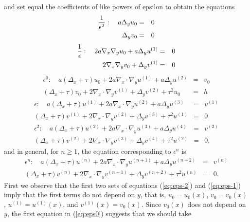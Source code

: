 \documentclass[12pt]{article}
\begin{document}
and set equal the coefficients of like powers of epsilon to obtain the equations
\begin{eqnarray}\label{eq:eps-2} {1\over{\epsilon^2}}: \quad  a\Delta_y u_0 &=& 0 \\ \Delta_y v_0 &=& 0 \nonumber\end{eqnarray}
\begin{eqnarray}\label{eq:eps-1} {1\over{\epsilon}}: \quad  2a \nabla_x \nabla_y u_0 +  a \Delta_y u^{(1)} &=& 0 \\ 2\nabla_x \nabla_y v_0 + \Delta_y v^{(1)} &=& 0 \nonumber \end{eqnarray}
\begin{eqnarray}\label{eq:eps0} {\epsilon^0}:  \quad  a(\Delta_x+\tau)u_0 + 2a \nabla_x\cdot \nabla_y u^{(1)}+  a \Delta_y u^{(2)} &=& v_0 \\  (\Delta_x+\tau)v_0 + 2\nabla_x\cdot \nabla_y v^{(1)} + \Delta_y v^{(2)} +\tau^2 u_0 &=& h\nonumber \end{eqnarray}
\begin{eqnarray}\label{eq:eps1} {\epsilon}:  \quad  a(\Delta_x+\tau)u^{(1)} + 2a \nabla_x\cdot \nabla_y u^{(2)}+  a \Delta_y u^{(3)} &=& v^{(1)} \\  (\Delta_x+\tau)v^{(1)} + 2\nabla_x\cdot \nabla_y v^{(2)} + \Delta_y v^{(3)} +\tau^2 u^{(1)} &=& 0\nonumber \end{eqnarray}
\begin{eqnarray}\label{eq:eps2} {\epsilon^2}:  \quad  a(\Delta_x+\tau)u^{(2)} + 2a \nabla_x\cdot \nabla_y u^{(3)}+  a \Delta_y u^{(4)} &=& v^{(2)} \\  (\Delta_x+\tau)v^{(2)} + 2\nabla_x\cdot \nabla_y v^{(3)} + \Delta_y v^{(4)} +\tau^2 u^{(2)} &=& 0,\nonumber\end{eqnarray}
and in general, for $n\geq 1$, the equation corresponding to $\epsilon^n$ is 
\begin{eqnarray}\label{eq:epsn} {\epsilon^n}:  \quad  a(\Delta_x+\tau)u^{(n)} + 2a \nabla_x\cdot \nabla_y u^{(n+1)}+  a \Delta_y u^{(n+2)} &=& v^{(n)} \\  (\Delta_x+\tau)v^{(n)} + 2\nabla_x\cdot \nabla_y v^{(n+1)} + \Delta_y v^{(n+2)} +\tau^2 u^{(n)} &=& 0.\nonumber\end{eqnarray}
First we observe that the first two sets of equations (\ref{eq:eps-2}) and (\ref{eq:eps-1}) imply that the first terms do not depend on $y$, that is, $u_0 =u_0(x)$, $v_0=v_0(x)$, $u^{(1)} =u^{(1)}(x)$, and $v^{(1)}(x)=v_0(x)$. Since $v_0(x)$ does not depend on $y$, the first equation in  (\ref{eq:eps0}) suggests that we should take 
\end{document}
